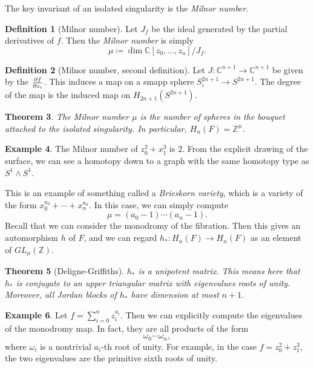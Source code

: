 \documentclass[leqno, openany]{memoir}
\newtheorem{thm}{Theorem}[chapter]
\theoremstyle{definition}
\newtheorem{defn}[thm]{Definition}
\newtheorem{exm}[thm]{Example}
\theoremstyle{remark}
\theoremstyle{plain}
\theoremstyle{definition}
\theoremstyle{remark}
\newcommand{\C}{\mathbb{C}}
\newcommand{\Z}{\mathbb{Z}}
\newcommand{\ep}{\varepsilon}
\begin{document}
The key invariant of an isolated singularity is the \textit{Milnor number}.
\begin{defn}[Milnor number]
    Let $J_f$ be the ideal generated by the partial derivatives of $f$. Then the \textit{Milnor number} is simply
    \[ \mu \coloneqq \dim \C[z_0, \ldots, z_n]/J_f. \]
\end{defn}

\begin{defn}[Milnor number, second definition]
    Let $J: \C^{n+1} \to \C^{n+1}$ be given by the $\pdv{f}{z_i}$. This induces a map on a smapp sphere $S_{\ep}^{2n+1} \to S^{2n+1}$. The degree of the map is the induced map on $H_{2n+1}(S^{2n+1})$.
\end{defn}

\begin{thm}
    The Milnor number $\mu$ is the number of spheres in the bouquet attached to the isolated singularity. In particular, $H_n(F) = \Z^{\mu}$.
\end{thm}

\begin{exm}
    The Milnor number of $z_0^2 + x_1^3$ is $2$. From the explicit drawing of the surface, we can see a homotopy down to a graph with the same homotopy type as $S^1 \wedge S^1$.
\end{exm}

This is an example of something called a \textit{Brieskorn variety}, which is a variety of the form $x_0^{a_0} + \cdots + x_n^{a_n}$. In this case, we can simply compute
\[ \mu = (a_0 - 1) \cdots (a_n - 1). \]
Recall that we can consider the monodromy of the fibration. Then this gives an automorphism $h$ of $F$, and we can regard $h_*: H_n(F) \to H_n(F)$ as an element of $GL_{\mu}(\Z)$.

\begin{thm}[Deligne-Griffiths]
    $h_*$ is a unipotent matrix. This means here that $h_*$ is conjugate to an upper triangular matrix with eigenvalues roots of unity. Moreover, all Jordan blocks of $h_*$ have dimension at most $n+1$.
\end{thm}

\begin{exm}
    Let $f = \sum_{i=0}^n z_i^{a_i}$. Then we can explicitly compute the eigenvalues of the monodromy map. In fact, they are all products of the form
    \[ \omega_0 \cdots \omega_n, \]
    where $\omega_i$ is a nontrivial $a_i$-th root of unity. For example, in the case $f = z_0^2 + z_1^3$, the two eigenvalues are the primitive sixth roots of unity.
\end{exm}
\end{document}
